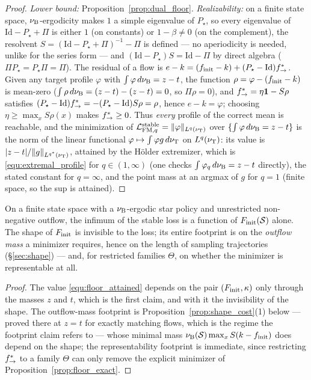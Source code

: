 \begin{proof}
\emph{Lower bound:} Proposition~\ref{prop:dual_floor}. \emph{Realizability:} on a finite
state space, $\nu_{\mathrm{B}}$-ergodicity makes $1$ a simple eigenvalue of $P_\star$, so every
eigenvalue of $\mathrm{Id}-P_\star+\Pi$ is either $1$ (on constants) or $1-\beta\neq0$
(on the complement), the resolvent $S=(\mathrm{Id}-P_\star+\Pi)^{-1}-\Pi$ is defined ---
no aperiodicity is needed, unlike for the series form --- and
$(\mathrm{Id}-P_\star)S=\mathrm{Id}-\Pi$ by direct algebra ($\Pi P_\star=P_\star\Pi=\Pi$).
The residual
of a flow is $e-k=(f_{\mathrm{init}}-k)+(P_\star-\mathrm{Id})f^*_{\rightarrow}$. Given any target profile
$\varphi$ with $\int\varphi\,d\nu_{\mathrm{B}}=z-t$, the function $\rho=\varphi-(f_{\mathrm{init}}-k)$ is
mean-zero ($\int\rho\,d\nu_{\mathrm{B}}=(z-t)-(z-t)=0$, so $\Pi\rho=0$), and
$f^*_{\rightarrow}=\eta\mathbf 1-S\rho$ satisfies
$(P_\star-\mathrm{Id})f^*_{\rightarrow}=-(P_\star-\mathrm{Id})S\rho=\rho$, hence $e-k=\varphi$;
choosing $\eta\geq\max_xS\rho(x)$ makes $f^*_{\rightarrow}\geq0$. Thus \emph{every} profile of the
correct mean is reachable, and the minimization of $\mathcal L_{\mathrm{FM},q}^{\mathrm{stable}}=\|\varphi\|_{L^q(\nu_{\mathrm{T}})}$
over $\{\int\varphi\,d\nu_{\mathrm{B}}=z-t\}$ is the norm of the linear functional
$\varphi\mapsto\int\varphi g\,d\nu_{\mathrm{T}}$ on $L^q(\nu_{\mathrm{T}})$: its value is
$|z-t|/\|g\|_{L^{q^*}(\nu_{\mathrm{T}})}$, attained by the H\"older extremizer, which is
\eqref{equ:extremal_profile} for $q\in(1,\infty)$ (one checks
$\int\varphi_q\,d\nu_{\mathrm{B}}=z-t$ directly), the stated constant for $q=\infty$, and the point
mass at an argmax of $g$ for $q=1$ (finite space, so the sup is attained).
\end{proof}

\begin{corollary}\label{cor:separation}
On a finite state space with a $\nu_{\mathrm{B}}$-ergodic star policy and unrestricted non-negative
outflow, the infimum of the stable loss is a function of $F_{\mathrm{init}}(\mathcal S)$ alone. The
shape of $F_{\mathrm{init}}$ is invisible to the loss; its entire footprint is on the \emph{outflow
mass} a minimizer requires, hence on the length of sampling trajectories
(\S\ref{sec:shape}) --- and, for restricted families $\Theta$, on whether the minimizer is
representable at all.
\end{corollary}

\begin{proof}
The value \eqref{equ:floor_attained} depends on the pair $(F_{\mathrm{init}},\kappa)$ only through
the masses $z$ and $t$, which is the first claim, and with it the invisibility of the
shape. The outflow-mass footprint is Proposition~\ref{prop:shape_cost}(1) below ---
proved there at $z=t$ for exactly matching flows, which is the regime the footprint
claim refers to --- whose
minimal mass $\nu_{\mathrm{B}}(\mathcal S)\max_xS(k-f_{\mathrm{init}})$ does depend on the shape; the
representability footprint is immediate, since restricting $f^*_{\rightarrow}$ to a family
$\Theta$ can only remove the explicit minimizer of
Proposition~\ref{prop:floor_exact}.
\end{proof}

